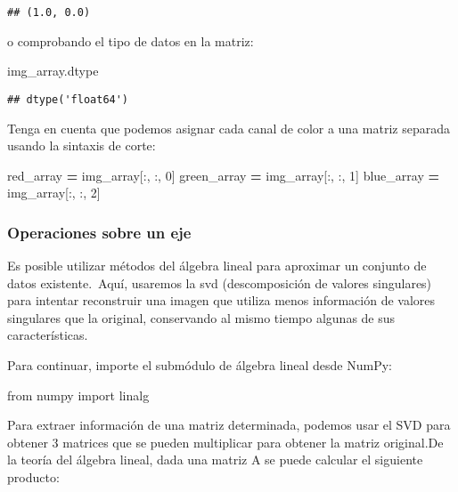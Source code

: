 \documentclass[
]{article}
\newenvironment{Shaded}{\begin{snugshade}}{\end{snugshade}}
\newcommand{\DecValTok}[1]{\textcolor[rgb]{0.00,0.00,0.81}{#1}}
\newcommand{\ImportTok}[1]{#1}
\newcommand{\NormalTok}[1]{#1}
\newcommand{\OperatorTok}[1]{\textcolor[rgb]{0.81,0.36,0.00}{\textbf{#1}}}
\begin{document}
\begin{verbatim}
## (1.0, 0.0)
\end{verbatim}

o comprobando el tipo de datos en la matriz:

\begin{Shaded}
\begin{Highlighting}[]
\NormalTok{img\_array.dtype}
\end{Highlighting}
\end{Shaded}

\begin{verbatim}
## dtype('float64')
\end{verbatim}

Tenga en cuenta que podemos asignar cada canal de color a una matriz
separada usando la sintaxis de corte:

\begin{Shaded}
\begin{Highlighting}[]
\NormalTok{red\_array }\OperatorTok{=}\NormalTok{ img\_array[:, :, }\DecValTok{0}\NormalTok{]}
\NormalTok{green\_array }\OperatorTok{=}\NormalTok{ img\_array[:, :, }\DecValTok{1}\NormalTok{]}
\NormalTok{blue\_array }\OperatorTok{=}\NormalTok{ img\_array[:, :, }\DecValTok{2}\NormalTok{]}
\end{Highlighting}
\end{Shaded}

\hypertarget{operaciones-sobre-un-eje}{%
\subsubsection{Operaciones sobre un
eje}\label{operaciones-sobre-un-eje}}

Es posible utilizar métodos del álgebra lineal para aproximar un
conjunto de datos existente.~Aquí, usaremos la svd (descomposición de
valores singulares) para intentar reconstruir una imagen que utiliza
menos información de valores singulares que la original, conservando al
mismo tiempo algunas de sus características.

Para continuar, importe el submódulo de álgebra lineal desde NumPy:

\begin{Shaded}
\begin{Highlighting}[]
\ImportTok{from}\NormalTok{ numpy }\ImportTok{import}\NormalTok{ linalg}
\end{Highlighting}
\end{Shaded}

Para extraer información de una matriz determinada, podemos usar el SVD
para obtener 3 matrices que se pueden multiplicar para obtener la matriz
original.De la teoría del álgebra lineal, dada una matriz A se puede
calcular el siguiente producto:
\end{document}
